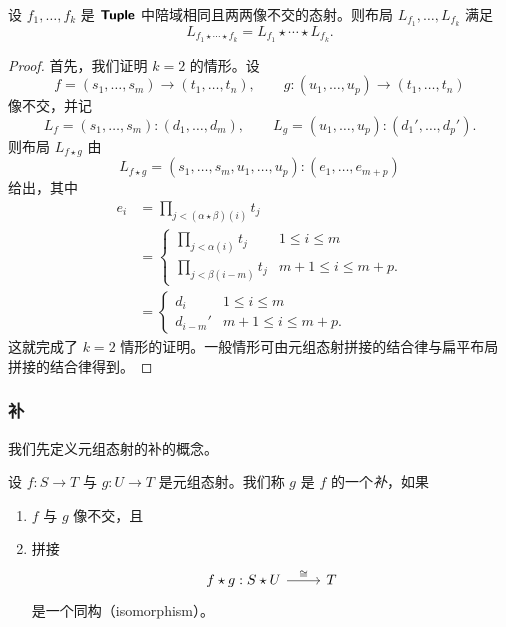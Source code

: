 \begin{proposition}\label{concatenateinCproposition}
    设 $f_1,\dots,f_k$ 是 ${\boldsymbol{\mathsf{Tuple}}}$ 中陪域相同且两两像不交的态射。则布局 $L_{f_1},\dots,L_{f_k}$ 满足
    \[
    L_{f_1 \star \cdots \star  f_k} =
    L_{f_1} \star \cdots \star  L_{f_k}.
    \]
\end{proposition}
\begin{proof}
    首先，我们证明 $k = 2$ 的情形。设
    \[f = (s_1,\dots,s_m) \to (t_1,\dots,t_n),\qquad g:(u_1,\dots,u_p) \to (t_1,\dots,t_n)\]
    像不交，并记
    \[L_f = (s_1,\dots,s_m):(d_1,\dots,d_m),\qquad L_g = (u_1,\dots, u_p) :(d_1',\dots,d_{p}').\]
    则布局 $L_{f \star g}$ 由
    \[
    L_{f \star g} = (s_1,\dots,s_m,u_1,\dots,u_p): (e_1,\dots,e_{m+p})
    \]
    给出，其中
    \begin{align*}
    e_i & = \prod_{j< (\alpha \star \beta)(i)} t_j \\
    & = \begin{cases}
        \displaystyle\prod_{j<\alpha(i)}t_j & 1 \leq i \leq m\\
        \displaystyle\prod_{j<\beta(i-m)} t_j & m+1 \leq i \leq m+p.
    \end{cases}\\
    & = \begin{cases}
        d_i & 1 \leq i \leq m\\
        d_{i-m}' & m+1 \leq i \leq m+p.
    \end{cases}
    \end{align*}
    这就完成了 $k = 2$ 情形的证明。一般情形可由元组态射拼接的结合律与扁平布局拼接的结合律得到。
\end{proof}

\subsubsection{补}
\label{subsubsection.complement}

我们先定义元组态射的补的概念。

\begin{definition}\label{definitionofcomplementarymorphismsinC} 设 $f:S \to T$ 与 $g:U \to T$ 是元组态射。我们称 $g$ 是 $f$ 的一个{\it 补}，如果
\begin{enumerate}
\item $f$ 与 $g$ 像不交，且
\item 拼接
\[ \begin{tikzcd} f \star g:S \star U \ar[r,"\cong"] &  T \end{tikzcd} \] 是一个同构（isomorphism）。
\end{enumerate}
\end{definition}


